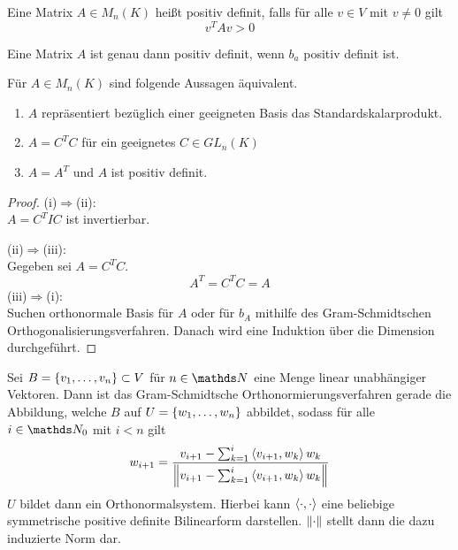 			\begin{definition}
				Eine Matrix $A\in M_n(K)$ heißt positiv definit, falls für alle $v\in V$ mit $v\neq 0$ gilt
				\[
					v^TAv > 0
				\]
			\end{definition}

			\begin{theorem}
				Eine Matrix $A$ ist genau dann positiv definit, wenn $b_a$ positiv definit ist.
			\end{theorem}

			\begin{theorem}
				Für $A\in M_n(K)$ sind folgende Aussagen äquivalent.
				\begin{enumerate}[label = \normalfont(\roman*)]
					\item $A$ repräsentiert bezüglich einer geeigneten Basis das Standardskalarprodukt.
					\item $A=C^TC$ für ein geeignetes $C\in GL_n(K)$
					\item $A=A^T$ und $A$ ist positiv definit.
				\end{enumerate}

			\end{theorem}
			\begin{proof}
				(i)$\Rightarrow$(ii):\\
				$A=C^TIC$ ist invertierbar.
				
				(ii)$\Rightarrow$(iii):\\
				Gegeben sei $A=C^TC$.
				\[
					A^T = C^TC = A
				\]
				(iii)$\Rightarrow$(i):\\
				Suchen orthonormale Basis für $A$ oder für $b_A$ mithilfe des Gram-Schmidtschen Orthogonalisierungsverfahren.
				Danach wird eine Induktion über die Dimension durchgeführt.
			\end{proof}

			\begin{definition}
				Sei $B = \left\{ v_1,\ldots,v_n \right\} \subset V$ für $n\in\SN$ eine Menge linear unabhängiger Vektoren.
				Dann ist das Gram-Schmidtsche Orthonormierungsverfahren gerade die Abbildung, welche $B$ auf $U=\left\{ w_1,\ldots,w_n \right\}$ abbildet, sodass für alle $i\in\SN_0$ mit $i<n$ gilt
				\[ w_{i+1} = \frac{v_{i+1} - \sum_{k=1}^i \left\langle v_{i+1}, w_k \right\rangle w_k}{\left\| v_{i+1} - \sum_{k=1}^i \left\langle v_{i+1}, w_k \right\rangle w_k \right\|} \]
				$U$ bildet dann ein Orthonormalsystem.
				Hierbei kann $\left\langle \cdot,\cdot \right\rangle$ eine beliebige symmetrische positive definite Bilinearform darstellen.
				$\left\| \cdot \right\|$ stellt dann die dazu induzierte Norm dar. 
			\end{definition}

